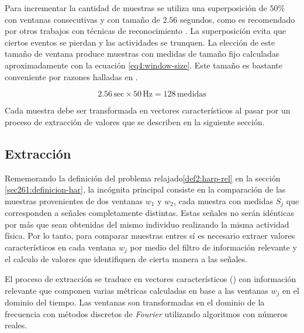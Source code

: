 Para incrementar la cantidad de muestras se utiliza una superposición
de $50\%$ con ventanas consecutivas y con tamaño de $2.56$ segundos,
como es recomendado por otros trabajos con técnicas de reconocimiento
\cite{Bao2004,ReyesOrtiz2015}. La superposición evita que ciertos
eventos se pierdan y las actividades se trunquen. La elección de este
tamaño de ventana produce muestras con medidas de tamaño fijo calculadas
aproximadamente con la ecuación \ref{eq4:window-size}. Este tamaño
es bastante conveniente por razones halladas en \cite{ReyesOrtiz2015}.

\begin{equation}
2.56\,\mathrm{sec}\times50\mathrm{\,Hz}=128\,\mathrm{medidas}\label{eq4:window-size}
\end{equation}

Cada muestra debe ser transformada en vectores característicos al
pasar por un proceso de extracción de valores que se describen en
la siguiente sección.

\subsection{Extracción}

\label{ssec44:extraction}Rememorando la definición del problema relajado\ref{def2:harp-rel}
en la sección \ref{sec261:definicion-har}, la incógnita principal
consiste en la comparación de las muestras provenientes de dos ventanas
$w_{1}$ y $w_{2}$, cada muestra con medidas $S_{j}$ que corresponden
a señales completamente distintas. Estas señales no serán idénticas
por más que sean obtenidas del mismo individuo realizando la misma
actividad física. Por lo tanto, para comparar muestras entres sí es
necesario extraer valores característicos en cada ventana $w_{j}$
por medio del filtro de información relevante y el calculo de valores
que identifiquen de cierta manera a las señales. 

El proceso de extracción se traduce en vectores característicos ()
con información relevante que componen varias métricas calculadas
en base a las ventanas $w_{j}$ en el dominio del tiempo. Las ventanas
son transformadas en el dominio de la frecuencia con métodos discretos
de\emph{ Fourier} utilizando algoritmos  con números reales. 


